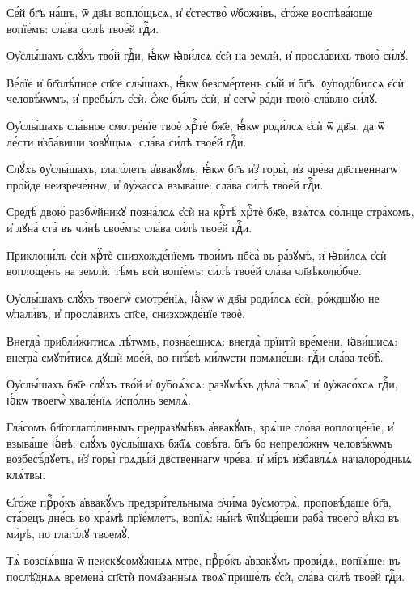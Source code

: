 \hKv Се́й бг҃ъ на́шъ, ѿ дв҃ы вопло́щьсѧ, и҆ є҆стество̀  ѡ҆божи́въ, є҆го́же воспѣва́юще вопїе́мъ: сла́ва си́лѣ  твое́й гдⷭ҇и. 

\hKv Оу҆слы́шахъ слꙋ́хъ тво́й гдⷭ҇и, ꙗ҆́кѡ ꙗ҆ви́лсѧ є҆сѝ на  землѝ, и҆ просла́вихъ твою̀ си́лꙋ. 

\hKv Ве́лїе и҆ бг҃олѣ́пное сп҃се слы́шахъ, ꙗ҆́кѡ безсме́ртенъ  сы́й и҆ бг҃ъ, ᲂу҆подо́билсѧ є҆сѝ   человѣ́кѡмъ, и҆ пребы́лъ є҆сѝ, є҆́же бы́лъ є҆сѝ, и҆  сегѡ̀ ра́ди твою̀ сла́влю си́лꙋ. 
%

\hKv Оу҆слы́шахъ сла́вное смотре́нїе твоѐ  хрⷭ҇тѐ бж҃е, ꙗ҆́кѡ роди́лсѧ є҆сѝ ѿ дв҃ы, да ѿ ле́сти  и҆зба́виши зовꙋ́щыѧ: сла́ва си́лѣ твое́й гдⷭ҇и. 

\hKv Слꙋ́хъ ᲂу҆слы́шахъ, глаго́летъ а҆ввакꙋ́мъ, ꙗ҆́кѡ бг҃ъ  и҆з̾ горы̀, и҆з̾ чре́ва дв҃ственнагѡ про́йде неизрече́ннѡ,  и҆ ᲂу҆жа́ссѧ взыва́ше: сла́ва си́лѣ твое́й гдⷭ҇и. 

\hKv Средѣ̀ двою̀ разбѡ́йникꙋ позна́лсѧ є҆сѝ на крⷭ҇тѣ̀  хрⷭ҇тѐ бж҃е, взѧ́тсѧ со́лнце стра́хомъ, и҆ лꙋна̀ ста̀ въ  чи́нѣ свое́мъ: сла́ва си́лѣ твое́й гдⷭ҇и. 

\hKv Приклони́лъ є҆сѝ хрⷭ҇тѐ снизхожде́нїемъ твои́мъ нб҃са̀ въ  ра́зꙋмѣ, и҆ ꙗ҆ви́лсѧ є҆сѝ воплоще́нъ на землѝ. тѣ́мъ  всѝ вопїе́мъ: си́лѣ твое́й сла́ва чл҃вѣколю́бче. 

\hKv Оу҆слы́шахъ слꙋ́хъ твоегѡ̀ смотре́нїѧ, ꙗ҆́кѡ ѿ дв҃ы  роди́лсѧ є҆сѝ, ро́ждшꙋю не ѡ҆пали́въ, и҆ просла́вихъ  сп҃се, снизхожде́нїе твоѐ.  

\hKv Внегда̀ прибли́житисѧ лѣ́тѡмъ, позна́ешисѧ: внегда̀ прїитѝ  вре́мени, ꙗ҆ви́шисѧ: внегда̀ смꙋти́тисѧ дꙋшѝ мое́й, во  гнѣ́вѣ ми́лѡсти помѧне́ши: гдⷭ҇и сла́ва тебѣ̀. 

\hKv Оу҆слы́шахъ бж҃е слꙋ́хъ тво́й и҆ ᲂу҆боѧ́хсѧ: разꙋмѣ́хъ  дѣла̀ твоѧ̑, и҆ ᲂу҆жасо́хсѧ гдⷭ҇и, ꙗ҆́кѡ твоегѡ̀  хвале́нїѧ и҆спо́лнь землѧ̀. 

\hKv Гла́сомъ бл҃гоглаго́ливымъ предразꙋмѣ́въ а҆ввакꙋ́мъ, зрѧ́ше  сло́ва воплоще́нїе, и҆ взыва́ше ꙗ҆́вѣ: слꙋ́хъ ᲂу҆слы́шахъ  бж҃їѧ совѣ́та. бг҃ъ бо непрело́жнѡ человѣ́кѡмъ  возбесѣ́дꙋетъ, и҆з̾ горы̀ грѧды́й дв҃ственнагѡ чре́ва, и҆  мі́ръ и҆збавлѧ́ѧ началоро́дныѧ клѧ́твы.  

\hKv Є҆го́же прⷪ҇ро́къ а҆ввакꙋ́мъ предзри́тельныма ѻ҆чи́ма  ᲂу҆смотрѧ̀, проповѣ́даше бг҃а, ста́рецъ дне́сь во хра́мѣ  прїе́млетъ, вопїѧ̀: ны́нѣ ѿпꙋща́еши раба̀ твоего̀ влⷣко  въ ми́рѣ, по глаго́лꙋ твоемꙋ̀. 

\hKv Тѧ̀ возсїѧ́вша ѿ неискꙋсомꙋ́жныѧ мт҃ре, прⷪ҇ро́къ  а҆ввакꙋ́мъ прови́дѧ, вопїѧ́ше: въ   послѣ̑днѧѧ времена̀ сп҃стѝ пома̑занныѧ твоѧ̑ прише́лъ  є҆сѝ, сла́ва си́лѣ твое́й гдⷭ҇и. 

